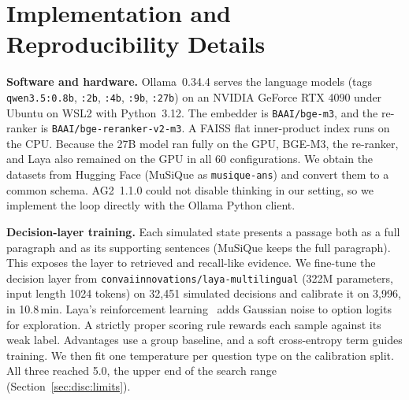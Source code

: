 \section{Implementation and Reproducibility Details}
\label{sec:appendix}

\textbf{Software and hardware.} Ollama~0.34.4 serves the language models (tags
\texttt{qwen3.5:0.8b}, \texttt{:2b}, \texttt{:4b}, \texttt{:9b}, \texttt{:27b}) on an
NVIDIA GeForce RTX 4090 under Ubuntu on WSL2 with Python~3.12. The embedder is
\texttt{BAAI/\allowbreak bge-m3}, and the re-ranker is
\texttt{BAAI/\allowbreak bge-reranker-\allowbreak v2-m3}. A FAISS flat inner-product
index runs on the CPU. Because the 27B model ran fully on the GPU, BGE-M3, the re-ranker,
and Laya also remained on the GPU in all 60 configurations. We obtain the datasets from
Hugging Face (MuSiQue as \texttt{musique-ans}) and convert them to a common schema.
AG2~1.1.0 could not disable thinking in our setting, so we implement the loop directly
with the Ollama Python client.

\textbf{Decision-layer training.} Each simulated state presents a passage both as a full
paragraph and as its supporting sentences (MuSiQue keeps the full paragraph). This exposes
the layer to retrieved and recall-like evidence. We fine-tune the decision layer from
\texttt{convaiinnovations/\allowbreak laya-multilingual} (322M parameters, input length 1024 tokens) on
32{,}451 simulated decisions and calibrate it on 3{,}996, in 10.8\,min.
Laya's reinforcement learning~\cite{laya} adds Gaussian noise to option logits for
exploration. A strictly proper scoring rule rewards each sample against its weak label.
Advantages use a group baseline, and a soft cross-entropy term guides training. We then
fit one temperature per question type on the calibration split. All three reached
5.0, the upper end of the search range (Section~\ref{sec:disc:limits}).

